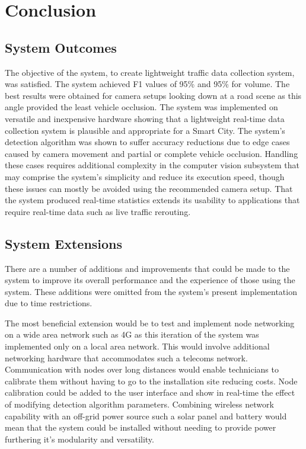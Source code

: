 \chapter{Conclusion}

\section{System Outcomes}

The objective of the system, to create lightweight traffic data collection system, was satisfied. The system achieved F1 values of 95\% and 95\% for volume. The best results were obtained for camera setups looking down at a road scene as this angle provided the least vehicle occlusion. The system was implemented on versatile and inexpensive hardware showing that a lightweight real-time data collection system is plausible and appropriate for a Smart City. The system's detection algorithm was shown to suffer accuracy reductions due to edge cases caused by camera movement and partial or complete vehicle occlusion. Handling these cases requires additional complexity in the computer vision subsystem that may comprise the system's simplicity and reduce its execution speed, though these issues can mostly be avoided using the recommended camera setup. That the system produced real-time statistics extends its usability to applications that require real-time data such as live traffic rerouting. 

\section{System Extensions}

There are a number of additions and improvements that could be made to the system to improve its overall performance and the experience of those using the system. These additions were omitted from the system's present implementation due to time restrictions. 

The most beneficial extension would be to test and implement node networking on a wide area network such as 4G as this iteration of the system was implemented only on a local area network. This would involve additional networking hardware that accommodates such a telecoms network. Communication with nodes over long distances would enable technicians to calibrate them without having to go to the installation site reducing costs. Node calibration could be added to the user interface and show in real-time the effect of modifying detection algorithm parameters. Combining wireless network capability with an off-grid power source such a solar panel and battery would mean that the system could be installed without needing to provide power furthering it's modularity and versatility.

